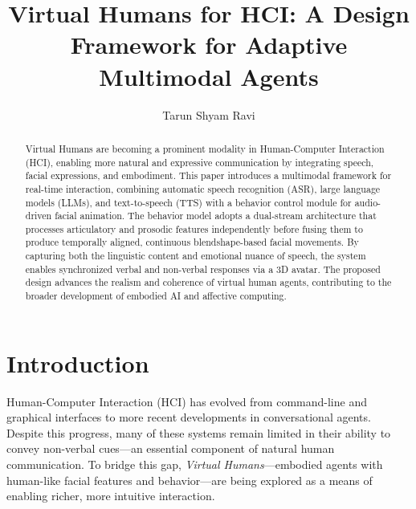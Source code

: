 \documentclass[runningheads]{llncs}
\begin{document}
%
\title{Virtual Humans for HCI: A Design Framework for Adaptive Multimodal Agents }

%
\author{Tarun Shyam Ravi}
%
%
%
\maketitle           %
%
\begin{abstract}
Virtual Humans are becoming a prominent modality in Human-Computer Interaction (HCI), enabling more natural and expressive communication by integrating speech, facial expressions, and embodiment. This paper introduces a multimodal framework for real-time interaction, combining automatic speech recognition (ASR), large language models (LLMs), and text-to-speech (TTS) with a behavior control module for audio-driven facial animation. The behavior model adopts a dual-stream architecture that processes articulatory and prosodic features independently before fusing them to produce temporally aligned, continuous blendshape-based facial movements. By capturing both the linguistic content and emotional nuance of speech, the system enables synchronized verbal and non-verbal responses via a 3D avatar. The proposed design advances the realism and coherence of virtual human agents, contributing to the broader development of embodied AI and affective computing.
\end{abstract}

\section{Introduction}

Human-Computer Interaction (HCI) has evolved from command-line and graphical interfaces to more recent developments in conversational agents. Despite this progress, many of these systems remain limited in their ability to convey non-verbal cues—an essential component of natural human communication. To bridge this gap, \textit{Virtual Humans}—embodied agents with human-like facial features and behavior—are being explored as a means of enabling richer, more intuitive interaction.
\end{document}
